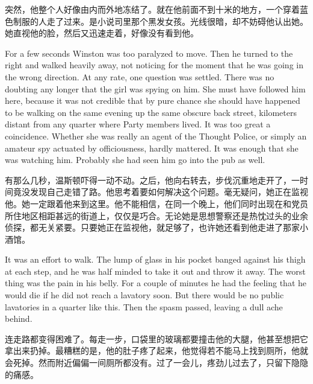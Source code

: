 \begin{paracol}{2}
\switchcolumn


突然，他整个人好像由内而外地冻结了。就在他前面不到十米的地方，一个穿着蓝色制服的人走了过来。是小说司里那个黑发女孩。光线很暗，却不妨碍他认出她。她直视他的脸，然后又迅速走着，好像没有看到他。

\switchcolumn*

For a few seconds Winston was too paralyzed to move. Then he turned to
the right and walked heavily away, not noticing for the moment that he
was going in the wrong direction. At any rate, one question was settled.
There was no doubting any longer that the girl was spying on him. She
must have followed him here, because it was not credible that by pure
chance she should have happened to be walking on the same evening up the
same obscure back street, kilometers distant from any quarter where
Party members lived. It was too great a coincidence. Whether she was
really an agent of the Thought Police, or simply an amateur spy actuated
by officiousness, hardly mattered. It was enough that she was watching
him. Probably she had seen him go into the pub as well.

\switchcolumn

有那么几秒，温斯顿吓得一动不动。之后，他向右转去，步伐沉重地走开了，一时间竟没发现自己走错了路。他思考着要如何解决这个问题。毫无疑问，她正在监视他。她一定跟着他来到这里。他不能相信，在同一个晚上，他们同时出现在和党员所住地区相距甚远的街道上，仅仅是巧合。无论她是思想警察还是热忱过头的业余侦探，都无关紧要。只要她正在监视他，就足够了，也许她还看到他走进了那家小酒馆。

\switchcolumn*

It was an effort to walk. The lump of glass in his pocket banged against
his thigh at each step, and he was half minded to take it out and throw
it away. The worst thing was the pain in his belly. For a couple of
minutes he had the feeling that he would die if he did not reach a
lavatory soon. But there would be no public lavatories in a quarter like
this. Then the spasm passed, leaving a dull ache behind.

\switchcolumn

连走路都变得困难了。每走一步，口袋里的玻璃都要撞击他的大腿，他甚至想把它拿出来扔掉。最糟糕的是，他的肚子疼了起来，他觉得若不能马上找到厕所，他就会死掉。然而附近偏偏一间厕所都没有。过了一会儿，疼劲儿过去了，只留下隐隐的痛感。

\switchcolumn*


\end{paracol}
